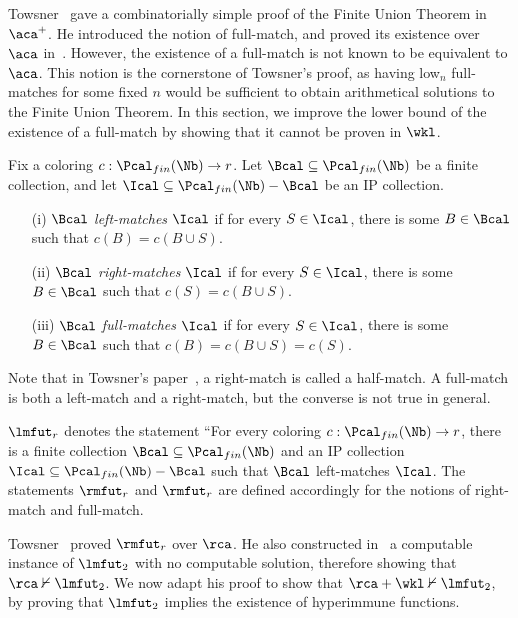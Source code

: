 
Towsner~\cite{Towsner2012simple} gave a combinatorially simple proof of the Finite Union Theorem in $\aca^{+}$. He introduced the notion of full-match, and proved its existence over $\aca$ in~\cite[Lemma 2.7]{Towsner2012simple}.  However, the existence of a full-match is not known to be equivalent to $\aca$. This notion is the cornerstone of Towsner's proof, as having low${}_n$ full-matches for some fixed $n$ would be sufficient to obtain arithmetical solutions to the Finite Union Theorem. In this section, we improve the lower bound of the existence of a full-match by showing that it cannot be proven in $\wkl$.

\begin{definition}
Fix a coloring $c : \Pcal_{fin}(\Nb) \to r$.
Let $\Bcal \subseteq \Pcal_{fin}(\Nb)$ be a finite collection,
and let $\Ical \subseteq \Pcal_{fin}(\Nb) - \Bcal$ be an IP collection.
\begin{itemize}
	\item[(i)] $\Bcal$ \emph{left-matches} $\Ical$ if for every $S \in \Ical$, there is some $B \in \Bcal$ such that $c(B) = c(B \cup S)$. 
	\item[(ii)] $\Bcal$ \emph{right-matches} $\Ical$ if for every $S \in \Ical$, there is some $B \in \Bcal$ such that $c(S) = c(B \cup S)$. 
	\item[(iii)] $\Bcal$ \emph{full-matches} $\Ical$ if for every $S \in \Ical$, there is some $B \in \Bcal$ such that $c(B) = c(B \cup S) = c(S)$. 
\end{itemize}
\end{definition}

Note that in Towsner's paper~\cite{Towsner2012simple}, a right-match is called a half-match. A full-match is both a left-match and a right-match, but the converse is not true in general.

\begin{statement}
	$\lmfut_r$ denotes the statement ``For every coloring $c :\Pcal_{fin}(\Nb) \to r$, there is a finite collection $\Bcal \subseteq \Pcal_{fin}(\Nb)$  and an IP collection $\Ical \subseteq \Pcal_{fin}(\Nb) - \Bcal$ such that $\Bcal$ left-matches $\Ical$.
	The statements $\rmfut_r$ and $\rmfut_r$ are defined accordingly for the notions of right-match and full-match.
\end{statement}

Towsner~\cite[Lemma 2.5]{Towsner2012simple} proved $\rmfut_r$ over $\rca$. He also constructed in~\cite[Theorem 3.8]{Towsner2012simple} a computable instance of $\lmfut_2$ with no computable solution, therefore showing that $\rca \nvdash \lmfut_2$. We now adapt his proof to show that $\rca + \wkl \nvdash \lmfut_2$, by proving that $\lmfut_2$ implies the existence of hyperimmune functions.

